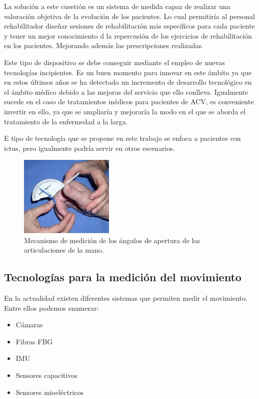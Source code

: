 La solución a este cuestión es un sistema de medida capaz de realizar una valoración objetiva de la evolución de los pacientes. Lo cual permitiría al personal rehabilitador diseñar sesiones de rehabilitación más específicos para cada paciente y tener un mejor conocimiento d la repercusión de los ejercicios de rehabilitación en los pacientes. Mejorando además las prescripciones realizadas. 

Este tipo de dispositivo se debe conseguir mediante el empleo de nuevas tecnologías incipientes. Es un buen momento para innovar en este ámbito ya que en estos últimos años se ha detectado un incremento de desarrollo tecnológico en el ámbito médico debido a las mejoras del servicio que ello conlleva. Igualmente sucede en el caso de tratamientos médicos para pacientes de ACV, es conveniente invertir en ello, ya que se ampliaría y mejoraría la modo en el que se aborda el tratamiento de la enfermedad a la larga. 

E tipo de tecnología que se propone en este trabajo se enfoca a pacientes con ictus, pero igualmente podría servir en otros escenarios.

\begin{figure}[H]
	\centering
	\includegraphics[width=0.4\textwidth]{./img/rehabAnti}
	\caption{Mecanismo de medición de los ángulos de apertura de las articulaciones de la mano. } 
	\label{fig:medidaAnticuada}
\end{figure} 


\subsection{Tecnologías para la medición del movimiento}
\label{sec:tecnologias2}

En la actualidad existen diferentes sistemas que permiten medir el movimiento. Entre ellos podemos enumerar:
\begin{itemize}
	\item {Cámaras}
	\item {Fibras FBG}
	\item {IMU}
	\item {Sensores capacitivos}
	\item {Sensores mioeléctricos}
\end{itemize}

